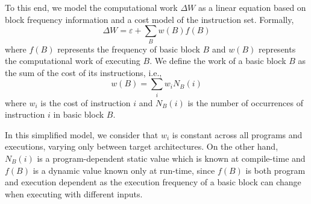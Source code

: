 \documentclass[sigplan,10pt]{acmart}
\theoremstyle{definition}
\newcommand{\itercomp}{{iterative compilation}}
\begin{document}
To this end, we model the computational work $\Delta W$ as a linear equation based on block frequency information and a cost model of the instruction set.
Formally,
\[
\Delta W = \varepsilon + \sum_{B} w(B)f(B)
\]
where $f(B)$ represents the frequency of basic block $B$ and $w(B)$ represents the computational work of executing $B$.
We define the work of a basic block $B$ as the sum of the cost of its instructions, i.e.,
\[
w(B) = \sum_{i} w_i N_B(i)
\]
where $w_i$ is the cost of instruction $i$ and $N_B(i)$ is the number of occurrences of instruction $i$ in basic block $B$.

In this simplified model, we consider that $w_i$ is constant across all programs and executions, varying only between target architectures.
On the other hand, $N_B(i)$ is a program-dependent static value which is known at compile-time and $f(B)$ is a dynamic value known only at run-time,
since $f(B)$ is both program and execution dependent as the execution frequency of a basic block can change when executing with different inputs.


%
\end{document}
